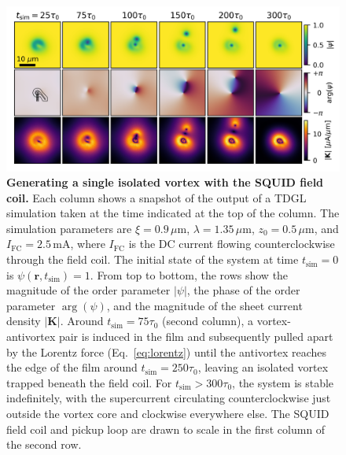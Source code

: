 \documentclass[%
 reprint,
 superscriptaddress,
 amsmath,
 amssymb,
 amsfonts,
 aps,
 prb,
]{revtex4-2}
\newcommand{\FC}{\mathrm{FC}}
\newcommand{\um}{\mu\mathrm{m}}
\begin{document}
\begin{figure}
    \centering
    \includegraphics[width=\linewidth]{figures/single-vortex-tdgl-flat.png}
    \caption{{\bf Generating a single isolated vortex with the SQUID field coil.} Each column shows a snapshot of the output of a TDGL simulation taken at the time indicated at the top of the column. The simulation parameters are $\xi=0.9\,\um$, $\lambda=1.35\,\um$, $z_0=0.5\,\um$, and $I_\FC=2.5\,\mathrm{mA}$, where $I_\FC$ is the DC current flowing counterclockwise through the field coil. The initial state of the system at time $t_\mathrm{sim}=0$ is $\psi(\mathbf{r}, t_\mathrm{sim})=1$. From top to bottom, the rows show the magnitude of the order parameter $|\psi|$, the phase of the order parameter $\arg(\psi)$, and the magnitude of the sheet current density $|\mathbf{K}|$.
    Around $t_\mathrm{sim}=75\tau_0$ (second column), a vortex-antivortex pair is induced in the film and subsequently pulled apart by the Lorentz force (Eq.~\ref{eq:lorentz}) until the antivortex reaches the edge of the film around $t_\mathrm{sim}=250\tau_0$, leaving an isolated vortex trapped beneath the field coil. For $t_\mathrm{sim}>300\tau_0$, the system is stable indefinitely, with the supercurrent circulating counterclockwise just outside the vortex core and clockwise everywhere else. The SQUID field coil and pickup loop are drawn to scale in the first column of the second row.}
    \label{fig:squid-vortex}
\end{figure}
\end{document}
